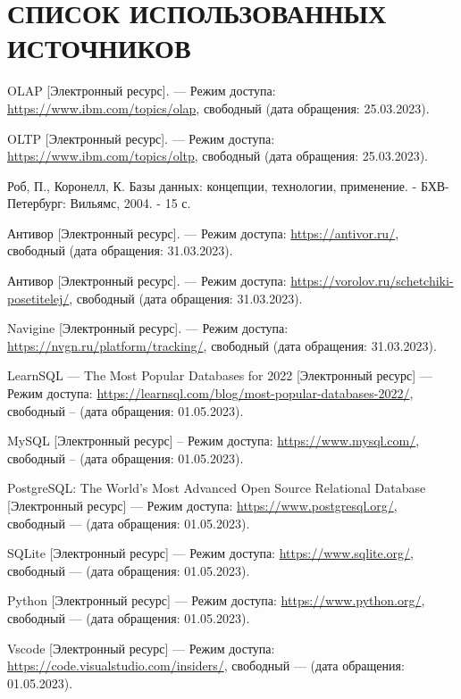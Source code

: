 \section*{СПИСОК ИСПОЛЬЗОВАННЫХ ИСТОЧНИКОВ}
\begingroup
\renewcommand{\section}[2]{}
\begin{thebibliography}{}

    OLAP [Электронный ресурс]. --- Режим доступа:
    \url{https://www.ibm.com/topics/olap}, свободный (дата обращения:
    25.03.2023).

    OLTP [Электронный ресурс]. --- Режим доступа:
    \url{https://www.ibm.com/topics/oltp}, свободный (дата обращения:
    25.03.2023).

    Роб, П., Коронелл, К. Базы данных: концепции, технологии, применение. -
    БХВ-Петербург: Вильямс, 2004. - 15 с.

    Антивор [Электронный ресурс]. --- Режим доступа: \url{https://antivor.ru/},
    свободный (дата обращения: 31.03.2023).

    Антивор [Электронный ресурс]. --- Режим доступа:
    \url{https://vorolov.ru/schetchiki-posetitelej/}, свободный (дата
    обращения:
    31.03.2023).

    Navigine [Электронный ресурс]. --- Режим доступа:
    \url{https://nvgn.ru/platform/tracking/}, свободный (дата обращения:
    31.03.2023).

    LearnSQL --- The Most Popular Databases for 2022 [Электронный ресурс]
    --- Режим доступа:
    \url{https://learnsql.com/blog/most-popular-databases-2022/}, свободный --
    (дата обращения: 01.05.2023).

    MySQL [Электронный ресурс] -- Режим доступа: \url{https://www.mysql.com/},
    свободный -- (дата обращения: 01.05.2023).

    PostgreSQL: The World's Most Advanced Open Source Relational Database
        [Электронный ресурс] --- Режим доступа:
    \url{https://www.postgresql.org/},
    свободный --- (дата обращения: 01.05.2023).

    SQLite [Электронный ресурс] --- Режим доступа: \url{https://www.sqlite.org/}, свободный --- (дата обращения: 01.05.2023).

    Python [Электронный ресурс] --- Режим доступа: \url{https://www.python.org/}, свободный --- (дата обращения: 01.05.2023).

    Vscode [Электронный ресурс] --- Режим доступа: \url{https://code.visualstudio.com/insiders/}, свободный --- (дата обращения: 01.05.2023).
\end{thebibliography}
\endgroup

\pagebreak